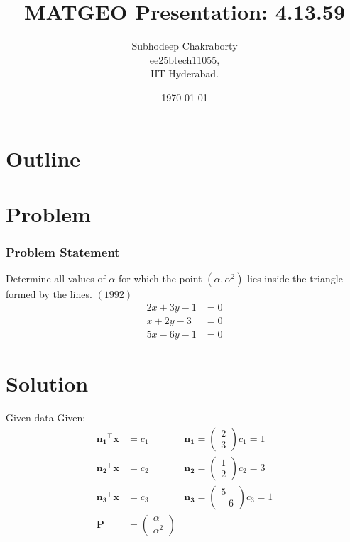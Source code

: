 \documentclass{beamer}
\title{MATGEO Presentation: 4.13.59}
\author{Subhodeep Chakraborty \\ ee25btech11055,\\IIT Hyderabad.}
\date{\today}
\providecommand{\brak}[1]{\ensuremath{\left(#1\right)}}
\theoremstyle{remark}
\newcommand{\myvec}[1]{\ensuremath{\begin{pmatrix}#1\end{pmatrix}}}
\let\vec\mathbf
\numberwithin{equation}{section}
\begin{document}
\begin{frame}
\titlepage
\end{frame}

\section*{Outline}
\begin{frame}
\tableofcontents
\end{frame}

\section{Problem}
\begin{frame}
\frametitle{Problem Statement}

Determine all values of $\alpha$ for which the point \brak{\alpha,\alpha^2} lies inside the triangle formed by the lines. \hfill\brak{1992}
\begin{align}
 2x+3y-1&=0\\
 x+2y-3&=0\\
 5x-6y-1&=0
\end{align}
\end{frame}

\section{Solution}
\begin{frame}{Given data}
Given:
\begin{align}
 \vec{n_1}^\top\vec{x}&=c_1 &\vec{n_1}=\myvec{2\\3} c_1 = 1 \\
 \vec{n_2}^\top\vec{x}&=c_2 &\vec{n_2}=\myvec{1\\2} c_2 = 3 \\
 \vec{n_3}^\top\vec{x}&=c_3 &\vec{n_3}=\myvec{5\\-6} c_3 = 1 \\
 \vec{P} &= \myvec{\alpha \\ \alpha^2} &
\end{align}
\end{frame}
\end{document}
